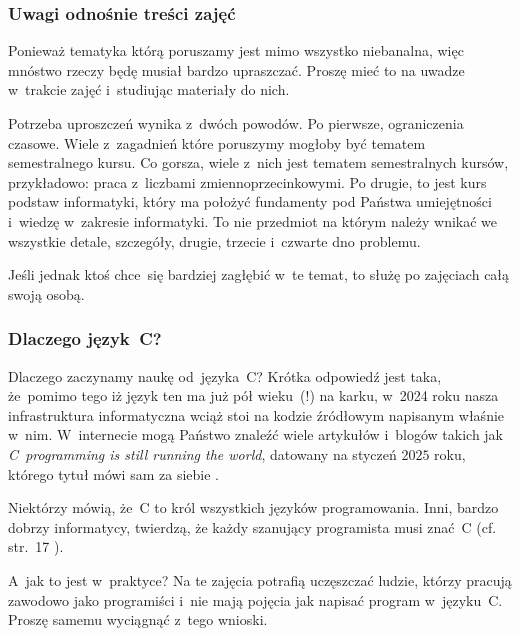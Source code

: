\documentclass[10pt,t]{beamer}
\begin{document}
\begin{frame}
  \frametitle{Uwagi odnośnie treści zajęć}


  Ponieważ tematyka którą poruszamy jest mimo wszystko niebanalna, więc
  mnóstwo rzeczy będę musiał bardzo \alert{upraszczać}. Proszę mieć to na
  uwadze w~trakcie zajęć i~studiując materiały do nich.

  Potrzeba uproszczeń wynika z~dwóch powodów. Po pierwsze, ograniczenia
  czasowe. Wiele z~zagadnień które poruszymy mogłoby być tematem
  semestralnego kursu. Co gorsza, wiele z~nich \alert{jest} tematem
  semestralnych kursów, przykładowo: praca z~liczbami zmiennoprzecinkowymi.
  Po drugie, to jest kurs \alert{podstaw} informatyki, który ma położyć
  fundamenty pod Państwa umiejętności i~wiedzę w~zakresie informatyki. To
  nie przedmiot na którym należy wnikać we wszystkie detale, szczegóły,
  drugie, trzecie i~czwarte dno problemu.

  Jeśli jednak ktoś chce~się bardziej zagłębić w~te temat, to służę po
  zajęciach całą swoją osobą.

\end{frame}





\begin{frame}
  \frametitle{Dlaczego język~C?}


  Dlaczego zaczynamy naukę od~języka~C? Krótka odpowiedź jest taka,
  że~pomimo tego iż język ten ma już pół wieku~(!) na karku, w~2024 roku
  nasza infrastruktura informatyczna wciąż stoi na kodzie źródłowym
  napisanym właśnie w~nim. W~internecie mogą Państwo znaleźć wiele
  artykułów i~blogów takich jak
  {\textit{C~programming is still running the world}}, datowany na styczeń
  $2025$ roku, którego tytuł mówi sam za siebie
  \parencite{Scott-C-programming-is-still-ETC-Ver-2025}.

  Niektórzy mówią, że~C to król wszystkich języków programowania.
  Inni, bardzo dobrzy informatycy, twierdzą, że każdy szanujący
  programista musi znać~C (cf. str.~17
  \parencite{Hoey-Programowanie-w-asemblerze-x64-ETC-Pub-2024}).

  A~jak to jest w~praktyce? Na te zajęcia potrafią uczęszczać ludzie,
  którzy pracują zawodowo jako programiści i~nie mają pojęcia jak napisać
  program w~języku~C. Proszę samemu wyciągnąć z~tego wnioski.

\end{frame}
\end{document}
